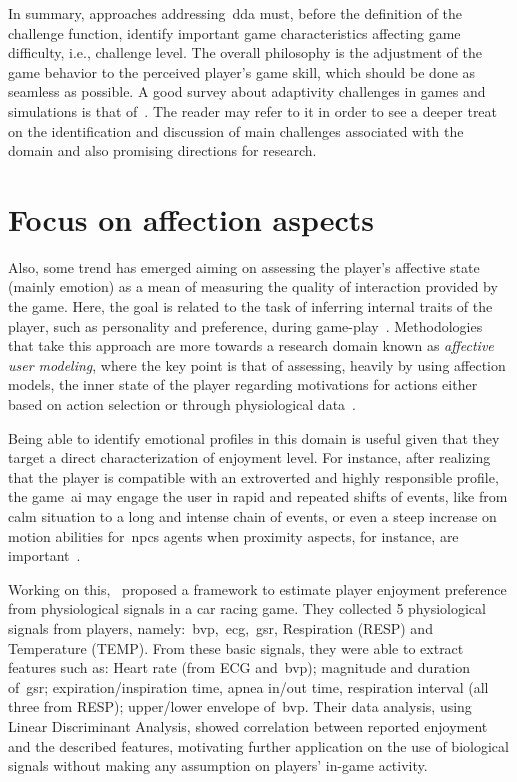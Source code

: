 In summary, approaches addressing~\gls{dda} must, before the definition of the challenge function, identify important game characteristics affecting game difficulty, i.e., challenge level. The overall philosophy is the adjustment of the game behavior to the perceived player's game skill, which should be done as seamless as possible. A good survey about adaptivity challenges in games and simulations is that of~\cite{lopes_adaptivity_2011}. The reader may refer to it in order to see a deeper treat on the identification and discussion of main challenges associated with the domain and also promising directions for research. %

\section{Focus on affection aspects}\label{affectmodeling}
Also, some trend has emerged aiming on assessing the player's affective state (mainly emotion) as a mean of measuring the quality of interaction provided by the game. Here, the goal is related to the task of inferring internal traits of the player, such as personality and preference, during game-play~\citep{van_lankveld_psychologically_2009}. Methodologies that take this approach are more towards a research domain known as \textit{affective user modeling}, where the key point is that of assessing, heavily by using affection models, the inner state of the player regarding motivations for actions either based on action selection or through physiological data~\citep{van_lankveld_psychologically_2009}.

Being able to identify emotional profiles in this domain is useful given that they target a direct characterization of enjoyment level. For instance, after realizing that the player is compatible with an extroverted and highly responsible profile, the game~\gls{ai} may engage the user in rapid and repeated shifts of events, like from calm situation to a long and intense chain of events, or even a steep increase on motion abilities for~\gls{npc}s agents when proximity aspects, for instance, are important~\citep{bakkes_player_2012}.

Working on this,~\cite{tognetti_modeling_2010} proposed a framework to estimate player enjoyment preference from physiological signals in a car racing game. They collected 5 physiological signals from players, namely:~\gls{bvp},~\gls{ecg},~\gls{gsr}, Respiration (RESP) and Temperature (TEMP). From these basic signals, they were able to extract features such as: Heart rate (from ECG and~\gls{bvp}); magnitude and duration of~\gls{gsr}; expiration/inspiration time, apnea in/out time, respiration interval (all three from RESP); upper/lower envelope of~\gls{bvp}. Their data analysis, using Linear Discriminant Analysis, showed correlation between reported enjoyment and the described features, motivating further application on the use of biological signals without making any assumption on players' in-game activity.

